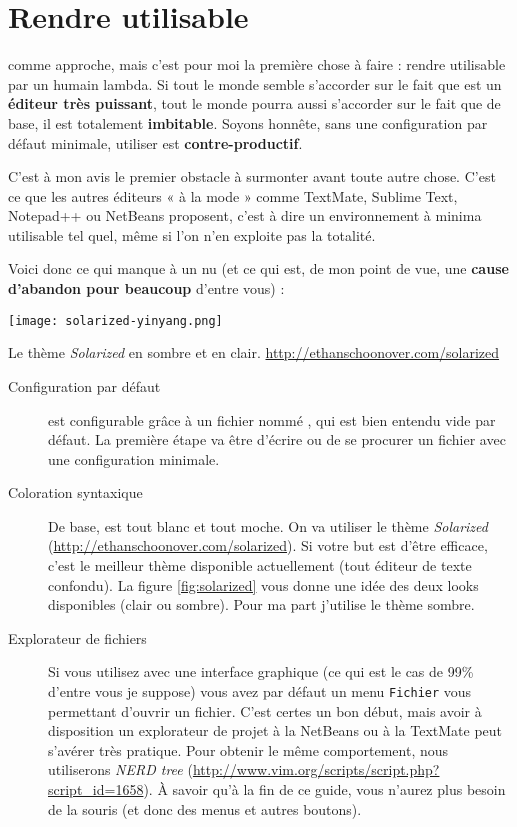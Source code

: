 \chapter{Rendre \vim utilisable}

 comme approche, mais c'est pour moi la première chose à faire : rendre \vim utilisable par un humain lambda. Si tout le monde semble s'accorder sur le fait que \vim est un \textbf{éditeur très puissant}, tout le monde pourra aussi s'accorder sur le fait que de base, il est totalement \textbf{imbitable}. Soyons honnête, sans une configuration par défaut minimale, utiliser \vim est \textbf{contre-productif}. 

C'est à mon avis le premier obstacle à surmonter avant toute autre chose. C'est ce que les autres éditeurs « à la mode » comme TextMate, Sublime Text, Notepad++ ou NetBeans proposent, c'est à dire un environnement à minima utilisable tel quel, même si l'on n'en exploite pas la totalité.

Voici donc ce qui manque à un \vim nu (et ce qui est, de mon point de vue, une \textbf{cause d'abandon pour beaucoup} d'entre vous) :

\begin{marginfigure}%
  \texttt{[image: solarized-yinyang.png]}
  \caption{Le thème \emph{Solarized} en sombre et en clair. \url{http://ethanschoonover.com/solarized}}
  \label{fig:solarized}
\end{marginfigure}

\begin{description}
    \item[Configuration par défaut] \vim est configurable grâce à un fichier nommé \vimrc, qui est bien entendu vide par défaut. La première étape va être d'écrire ou de se procurer un fichier \vimrc avec une configuration minimale.
    \item[Coloration syntaxique] De base, \vim est tout blanc et tout moche. On va utiliser le thème \emph{Solarized} (\url{http://ethanschoonover.com/solarized}). Si votre but est d'être efficace, c'est le meilleur thème disponible actuellement (tout éditeur de texte confondu). La figure \ref{fig:solarized} vous donne une idée des deux looks disponibles (clair ou sombre). Pour ma part j'utilise le thème sombre.
    \item[Explorateur de fichiers] Si vous utilisez \vim avec une interface graphique (ce qui est le cas de 99\% d'entre vous je suppose) vous avez par défaut un menu \Verb|Fichier| vous permettant d'ouvrir un fichier. C'est certes un bon début, mais avoir à disposition un explorateur de projet à la NetBeans ou à la TextMate peut s'avérer très pratique. Pour obtenir le même comportement, nous utiliserons \emph{NERD tree} (\url{http://www.vim.org/scripts/script.php?script_id=1658}). À savoir qu'à la fin de ce guide, vous n'aurez plus besoin de la souris (et donc des menus et autres boutons).
\end{description}

